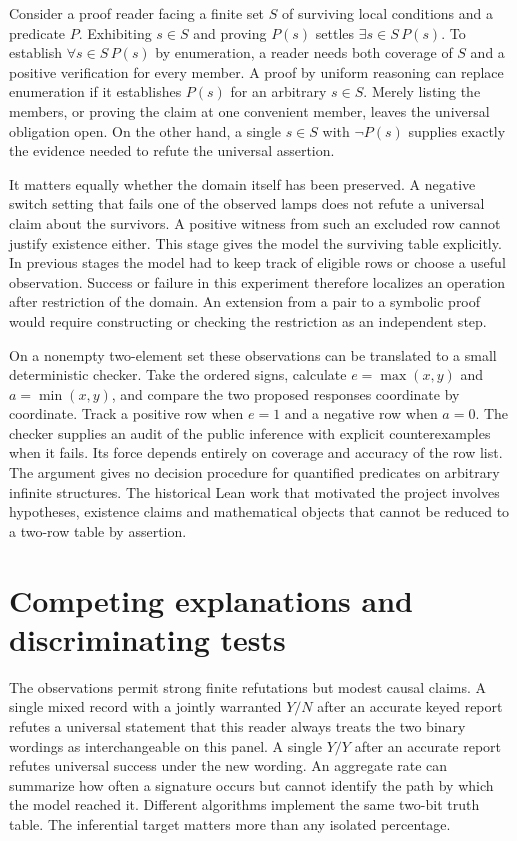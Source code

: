 \documentclass[12pt,letterpaper]{article}
\begin{document}
Consider a proof reader facing a finite set $S$ of surviving local conditions and a predicate $P$. Exhibiting $s\in S$ and proving $P(s)$ settles $\exists s\in S\,P(s)$. To establish $\forall s\in S\,P(s)$ by enumeration, a reader needs both coverage of $S$ and a positive verification for every member. A proof by uniform reasoning can replace enumeration if it establishes $P(s)$ for an arbitrary $s\in S$. Merely listing the members, or proving the claim at one convenient member, leaves the universal obligation open. On the other hand, a single $s\in S$ with $\neg P(s)$ supplies exactly the evidence needed to refute the universal assertion.

It matters equally whether the domain itself has been preserved. A negative switch setting that fails one of the observed lamps does not refute a universal claim about the survivors. A positive witness from such an excluded row cannot justify existence either. This stage gives the model the surviving table explicitly. In previous stages the model had to keep track of eligible rows or choose a useful observation. Success or failure in this experiment therefore localizes an operation after restriction of the domain. An extension from a pair to a symbolic proof would require constructing or checking the restriction as an independent step.

On a nonempty two-element set these observations can be translated to a small deterministic checker. Take the ordered signs, calculate $e=\max(x,y)$ and $a=\min(x,y)$, and compare the two proposed responses coordinate by coordinate. Track a positive row when $e=1$ and a negative row when $a=0$. The checker supplies an audit of the public inference with explicit counterexamples when it fails. Its force depends entirely on coverage and accuracy of the row list. The argument gives no decision procedure for quantified predicates on arbitrary infinite structures. The historical Lean work that motivated the project involves hypotheses, existence claims and mathematical objects that cannot be reduced to a two-row table by assertion.

\section{Competing explanations and discriminating tests}
The observations permit strong finite refutations but modest causal claims. A single mixed record with a jointly warranted $Y/N$ after an accurate keyed report refutes a universal statement that this reader always treats the two binary wordings as interchangeable on this panel. A single $Y/Y$ after an accurate report refutes universal success under the new wording. An aggregate rate can summarize how often a signature occurs but cannot identify the path by which the model reached it. Different algorithms implement the same two-bit truth table. The inferential target matters more than any isolated percentage.
\end{document}
